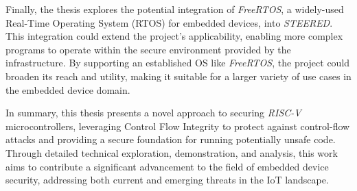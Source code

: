 Finally, the thesis explores the potential integration of \textit{FreeRTOS}, a widely-used
Real-Time Operating System (RTOS) for embedded devices, into \textit{STEERED}.
This integration could extend the project's applicability, enabling more complex
programs to operate within the secure environment provided by the infrastructure.
By supporting an established OS like \textit{FreeRTOS}, the project could
broaden its reach and utility, making it suitable for a larger variety of use cases
in the embedded device domain.

In summary, this thesis presents a novel approach to securing \textit{RISC-V} microcontrollers,
leveraging Control Flow Integrity to protect against control-flow attacks and
providing a secure foundation for running potentially unsafe code. Through detailed
technical exploration, demonstration, and analysis, this work aims to contribute
a significant advancement to the field of embedded device security, addressing both
current and emerging threats in the IoT landscape.